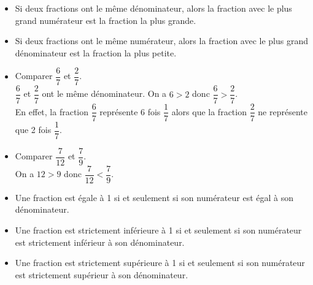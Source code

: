 \begin{Propriétés*}[c]
\leavevmode\vspace{-\baselineskip}
\begin{itemize}[label=\textcolor{Couleur1}{$\bullet$}]
\item Si deux fractions ont le même dénominateur, alors la fraction avec le plus grand numérateur est la fraction la plus grande.

\item Si deux fractions ont le même numérateur, alors la fraction avec le plus grand dénominateur est la fraction la plus petite.
\end{itemize}
\end{Propriétés*}

\begin{Exemples}
\begin{itemize}[label=\textcolor{Couleur8}{$\bullet$}]
\item Comparer $\dfrac{6}{7}$ et $\dfrac{2}{7}$. \\ 
$\dfrac{6}{7}$ et $\dfrac{2}{7}$ ont le même dénominateur. On a $6 > 2$ donc $\dfrac{6}{7} > \dfrac{2}{7}$.\\
 En effet, la fraction $ \dfrac{6}{7}$ représente 6 fois $\dfrac{1}{7}$ alors que la fraction $ \displaystyle\dfrac{2}{7}$ ne représente que 2 fois $\dfrac{1}{7}$.

\item Comparer $\dfrac{7}{12}$ et $\dfrac{7}{9}$.\\
On a $12 > 9$ donc $\dfrac{7}{12} < \dfrac{7}{9}$.

\end{itemize}
\end{Exemples}

\begin{Propriétés*}[c]
\leavevmode\vspace{-\baselineskip}
\begin{itemize}[label=\textcolor{Couleur1}{$\bullet$}]
\item Une fraction est égale à 1 si et seulement si son numérateur est égal à son dénominateur.

\item Une fraction est strictement inférieure à 1 si et seulement si son numérateur est strictement inférieur à son dénominateur.

\item Une fraction est strictement supérieure à 1 si et seulement si son numérateur est strictement supérieur à son dénominateur.
\end{itemize}
\end{Propriétés*}


